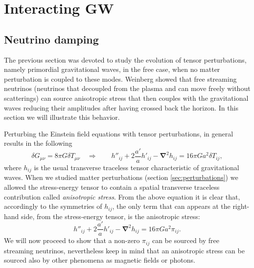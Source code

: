 \section{Interacting GW}
\subsection{Neutrino damping}
\label{sec:neutrino_damping}
The previous section was devoted to study the evolution of tensor perturbations, namely primordial gravitational waves, in the free case, when no matter perturbation is coupled to these modes. Weinberg \cite{Weinberg_nu_dump} showed that free streaming neutrinos (neutrinos that decoupled from the plasma and can move freely without scatterings) can source anisotropic stress that then couples with the gravitational waves reducing their amplitudes after having crossed back the horizon. In this section we will illustrate this behavior.

Perturbing the Einstein field equations with tensor perturbations, in general results in the following
$$\delta G_{\mu\nu}=8\pi G\delta T_{\mu\nu}\quad \Rightarrow\qquad h''_{ij}+2\frac{a'}{a}h'_{ij}-\boldsymbol{\nabla}^2 h_{ij}=16\pi G a^2\delta T_{ij},$$
where $h_{ij}$ is the usual transverse traceless tensor characteristic of gravitational waves. When we studied matter perturbations (section \ref{sec:perturbations}) we allowed the stress-energy tensor to contain a spatial transverse traceless contribution called \emph{anisotropic stress}. From the above equation it is clear that, accordingly to the symmetries of $h_{ij}$, the only term that can appears at the right-hand side, from the stress-energy tensor, is the anisotropic stress:
\begin{equation}
    h''_{ij}+2\frac{a'}{a}h'_{ij}-\boldsymbol{\nabla}^2 h_{ij}=16\pi G a^2\pi_{ij}.\label{eq:GW_EOM_stress}
\end{equation}
We will now proceed to show that a non-zero $\pi_{ij}$ can be sourced by free streaming neutrinos, nevertheless keep in mind that an anisotropic stress can be sourced also by other phenomena as magnetic fields or photons.

